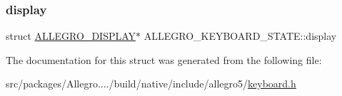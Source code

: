 \mbox{\label{struct_a_l_l_e_g_r_o___k_e_y_b_o_a_r_d___s_t_a_t_e_a3a0de008e166e446aa66daa738ad003d}} 
\subsubsection{\texorpdfstring{display}{display}}
{\footnotesize\ttfamily struct \hyperlink{display_8h_a7516185aa39c086f4bc62bd4bf5858bf}{A\+L\+L\+E\+G\+R\+O\+\_\+\+D\+I\+S\+P\+L\+AY}$\ast$ A\+L\+L\+E\+G\+R\+O\+\_\+\+K\+E\+Y\+B\+O\+A\+R\+D\+\_\+\+S\+T\+A\+T\+E\+::display}



The documentation for this struct was generated from the following file\+:\begin{DoxyCompactItemize}
\item 
src/packages/\+Allegro..../build/native/include/allegro5/\hyperlink{keyboard_8h}{keyboard.\+h}\end{DoxyCompactItemize}
